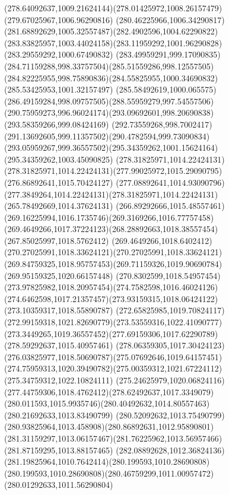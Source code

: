 {{		\curveto(278.64092637,1009.21624144)(278.01425972,1008.26157479)(279.67025967,1006.96290816)
		\curveto(280.46225966,1006.34290817)(281.68892629,1005.32557487)(282.4902596,1004.62290822)
		\curveto(283.83825957,1003.44024158)(283.11959292,1001.96290828)(283.29559292,1000.67490832)
		\curveto(283.49959291,999.17090835)(284.71159288,998.33757504)(285.51559286,998.12557505)
		\curveto(284.82225955,998.75890836)(284.55825955,1000.34690832)(285.53425953,1001.32157497)
		\curveto(285.58492619,1000.065575)(286.49159284,998.09757505)(288.55959279,997.54557506)
		\curveto(290.75959273,996.96024174)(293.09692601,998.20690838)(293.58359266,999.08424169)
		\curveto(292.73559268,998.7002417)(291.13692605,999.11357502)(290.4782594,999.73090834)
		\curveto(293.05959267,999.36557502)(295.34359262,1001.15624164)(295.34359262,1003.45090825)
		\moveto(278.31825971,1014.22424131)
		\curveto(278.31825971,1014.22424131)(277.99025972,1015.29090795)(276.86892641,1015.70424127)
		\curveto(277.08892641,1014.93090796)(277.3849264,1014.22424131)(278.31825971,1014.22424131)
		\moveto(265.78492669,1014.37624131)
		\curveto(266.89292666,1015.48557461)(269.16225994,1016.1735746)(269.3169266,1016.77757458)
		\curveto(269.4649266,1017.37224123)(268.28892663,1018.38557454)(267.85025997,1018.5762412)
		\curveto(269.4649266,1018.6402412)(270.27025991,1018.33624121)(270.27025991,1018.33624121)
		\curveto(269.84759325,1018.95757453)(269.71159326,1019.90690784)(269.95159325,1020.66157448)
		\curveto(270.8302599,1018.54957454)(273.97825982,1018.20957454)(274.7582598,1016.46024126)
		\curveto(274.6462598,1017.21357457)(273.93159315,1018.06424122)(273.10359317,1018.55890787)
		\curveto(272.65825985,1019.70824117)(272.99159318,1021.82690779)(273.53559316,1022.41090777)
		\curveto(273.3449265,1019.36557452)(277.69159306,1017.62290789)(278.59292637,1015.40957461)
		\curveto(278.06359305,1017.30424123)(276.03825977,1018.50690787)(275.07692646,1019.64157451)
		\curveto(274.75959313,1020.39490782)(275.00359312,1021.67224112)(275.34759312,1022.10824111)
		\curveto(275.24625979,1020.06824116)(277.44759306,1018.4762412)(278.62492637,1017.3349079)
		\curveto(280.011593,1015.9935746)(280.40492632,1014.80557463)(280.21692633,1013.83490799)
		\curveto(280.52092632,1013.75490799)(280.93825964,1013.458908)(280.86892631,1012.95890801)
		\curveto(281.31159297,1013.06157467)(281.76225962,1013.56957466)(281.87159295,1013.88157465)
		\curveto(282.08892628,1012.36824136)(281.19825964,1010.7642414)(280.199593,1010.28690808)
		\curveto(280.199593,1010.28690808)(280.46759299,1011.00957472)(280.01292633,1011.56290804)
}}
